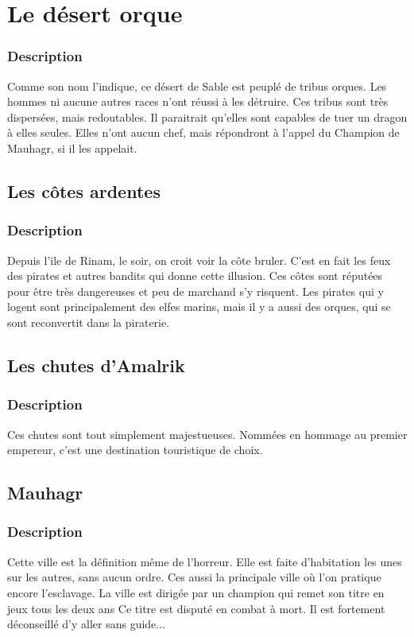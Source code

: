 \section{Le désert orque}
\subsubsection{Description}
\hypertarget{ledesertorque}{}Comme son nom l'indique, ce désert de Sable est peuplé de tribus orques. 
Les hommes ni aucune autres races n'ont réussi à les détruire.
Ces tribus sont très dispersées, mais redoutables.
Il paraitrait qu'elles sont capables de tuer un dragon à elles seules.
Elles n'ont aucun chef, mais répondront à l'appel du Champion de Mauhagr, si il les appelait. 
\subsection{Les côtes ardentes}
\subsubsection{Description}
\hypertarget{lescotesardentes}{}Depuis l'ile de Rinam, le soir, on croit voir la côte bruler.
C'est en fait les feux des pirates et autres bandits qui donne cette illusion.
Ces côtes sont réputées pour être très dangereuses et peu de marchand s'y risquent. 
Les pirates qui y logent sont principalement des elfes marins, mais il y a aussi des orques, qui se sont reconvertit dans la piraterie.
\subsection{Les chutes d'Amalrik}
\subsubsection{Description}
\hypertarget {leschutesdamalrik}{}Ces chutes sont tout simplement majestueuses.
Nommées en hommage au premier empereur, c'est une destination touristique de choix.
\subsection{Mauhagr}
\subsubsection{Description}
\hypertarget {mauhagr}{}Cette ville est la définition même de l'horreur.
Elle est faite d'habitation les unes sur les autres, sans aucun ordre. 
Ces aussi la principale ville où l'on pratique encore l'esclavage.
La ville est dirigée par un champion qui remet son titre en jeux tous les deux ans
Ce titre est disputé en combat à mort. 
Il est fortement déconseillé d'y aller sans guide...
